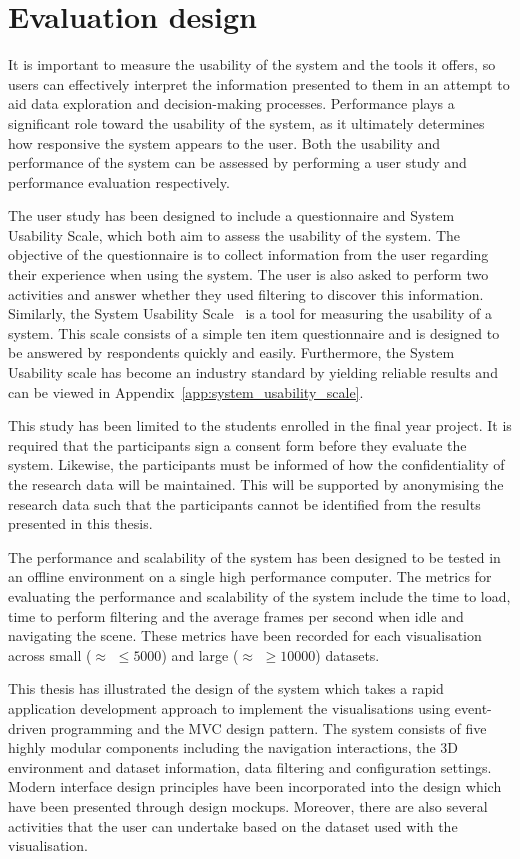 \section{Evaluation design} {
\label{sec:evaluation_design}

	It is important to measure the usability of the system and the tools it offers, so users can effectively interpret the information presented to them in an attempt to aid data exploration and decision-making processes. Performance plays a significant role toward the usability of the system, as it ultimately determines how responsive the system appears to the user. Both the usability and performance of the system can be assessed by performing a user study and performance evaluation respectively.

	The user study has been designed to include a questionnaire and System Usability Scale, which both aim to assess the usability of the system. The objective of the questionnaire is to collect information from the user regarding their experience when using the system. The user is also asked to perform two activities and answer whether they used filtering to discover this information. Similarly, the System Usability Scale~\parencite{brooke1996sus} is a tool for measuring the usability of a system. This scale consists of a simple ten item questionnaire and is designed to be answered by respondents quickly and easily. Furthermore, the System Usability scale has become an industry standard by yielding reliable results and can be viewed in Appendix~\ref{app:system_usability_scale}.

	This study has been limited to the students enrolled in the final year project. It is required that the participants sign a consent form before they evaluate the system. Likewise, the participants must be informed of how the confidentiality of the research data will be maintained. This will be supported by anonymising the research data such that the participants cannot be identified from the results presented in this thesis.

	The performance and scalability of the system has been designed to be tested in an offline environment on a single high performance computer. The metrics for evaluating the performance and scalability of the system include the time to load, time to perform filtering and the average frames per second when idle and navigating the scene. These metrics have been recorded for each visualisation across small ($\approx$ $\le5000$) and large ($\approx$ $\ge10000$) datasets.

}

This thesis has illustrated the design of the system which takes a rapid application development approach to implement the visualisations using event-driven programming and the MVC design pattern. The system consists of five highly modular components including the navigation interactions, the 3D environment and dataset information, data filtering and configuration settings. Modern interface design principles have been incorporated into the design which have been presented through design mockups. Moreover, there are also several activities that the user can undertake based on the dataset used with the visualisation.
